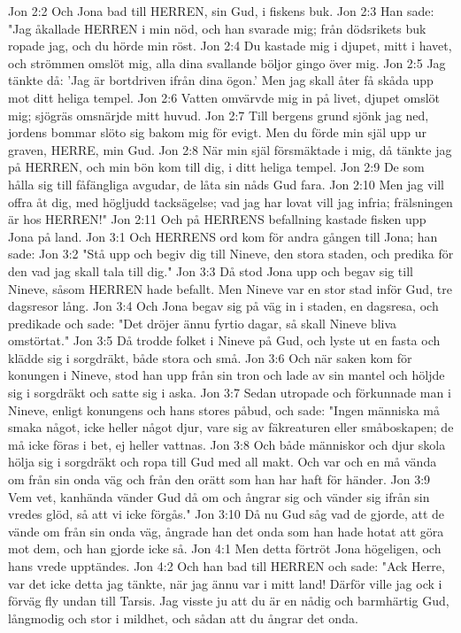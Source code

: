 Jon 2:2  Och Jona bad till HERREN, sin Gud, i fiskens buk.
Jon 2:3  Han sade: "Jag åkallade HERREN i min nöd, och han svarade mig; från dödsrikets buk ropade jag, och du hörde min röst.
Jon 2:4  Du kastade mig i djupet, mitt i havet, och strömmen omslöt mig, alla dina svallande böljor gingo över mig.
Jon 2:5  Jag tänkte då: 'Jag är bortdriven ifrån dina ögon.' Men jag skall åter få skåda upp mot ditt heliga tempel.
Jon 2:6  Vatten omvärvde mig in på livet, djupet omslöt mig; sjögräs omsnärjde mitt huvud.
Jon 2:7  Till bergens grund sjönk jag ned, jordens bommar slöto sig bakom mig för evigt. Men du förde min själ upp ur graven, HERRE, min Gud.
Jon 2:8  När min själ försmäktade i mig, då tänkte jag på HERREN, och min bön kom till dig, i ditt heliga tempel.
Jon 2:9  De som hålla sig till fåfängliga avgudar, de låta sin nåds Gud fara.
Jon 2:10  Men jag vill offra åt dig, med högljudd tacksägelse; vad jag har lovat vill jag infria; frälsningen är hos HERREN!"
Jon 2:11  Och på HERRENS befallning kastade fisken upp Jona på land.
Jon 3:1  Och HERRENS ord kom för andra gången till Jona; han sade:
Jon 3:2  "Stå upp och begiv dig till Nineve, den stora staden, och predika för den vad jag skall tala till dig."
Jon 3:3  Då stod Jona upp och begav sig till Nineve, såsom HERREN hade befallt. Men Nineve var en stor stad inför Gud, tre dagsresor lång.
Jon 3:4  Och Jona begav sig på väg in i staden, en dagsresa, och predikade och sade: "Det dröjer ännu fyrtio dagar, så skall Nineve bliva omstörtat."
Jon 3:5  Då trodde folket i Nineve på Gud, och lyste ut en fasta och klädde sig i sorgdräkt, både stora och små.
Jon 3:6  Och när saken kom för konungen i Nineve, stod han upp från sin tron och lade av sin mantel och höljde sig i sorgdräkt och satte sig i aska.
Jon 3:7  Sedan utropade och förkunnade man i Nineve, enligt konungens och hans stores påbud, och sade: "Ingen människa må smaka något, icke heller något djur, vare sig av fäkreaturen eller småboskapen; de må icke föras i bet, ej heller vattnas.
Jon 3:8  Och både människor och djur skola hölja sig i sorgdräkt och ropa till Gud med all makt. Och var och en må vända om från sin onda väg och från den orätt som han har haft för händer.
Jon 3:9  Vem vet, kanhända vänder Gud då om och ångrar sig och vänder sig ifrån sin vredes glöd, så att vi icke förgås."
Jon 3:10  Då nu Gud såg vad de gjorde, att de vände om från sin onda väg, ångrade han det onda som han hade hotat att göra mot dem, och han gjorde icke så.
Jon 4:1  Men detta förtröt Jona högeligen, och hans vrede upptändes.
Jon 4:2  Och han bad till HERREN och sade: "Ack Herre, var det icke detta jag tänkte, när jag ännu var i mitt land! Därför ville jag ock i förväg fly undan till Tarsis. Jag visste ju att du är en nådig och barmhärtig Gud, långmodig och stor i mildhet, och sådan att du ångrar det onda.
